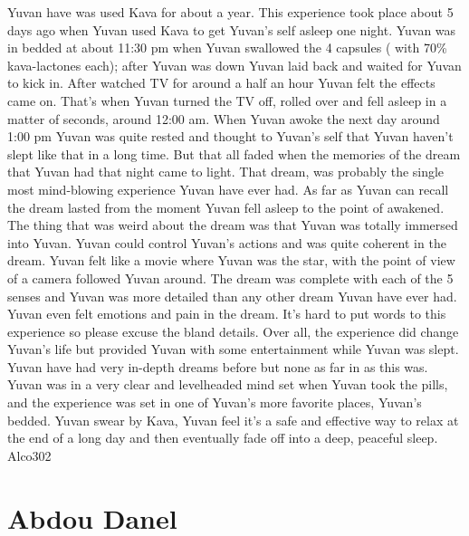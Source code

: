 \documentclass[12pt]{book}
\begin{document}
Yuvan have was used Kava for about a year. This experience took place about 5 days ago when Yuvan used Kava to get Yuvan's self asleep one night. Yuvan was in bedded at about 11:30 pm when Yuvan swallowed the 4 capsules ( with 70\% kava-lactones each); after Yuvan was down Yuvan laid back and waited for Yuvan to kick in. After watched TV for around a half an hour Yuvan felt the effects came on. That's when Yuvan turned the TV off, rolled over and fell asleep in a matter of seconds, around 12:00 am. When Yuvan awoke the next day around 1:00 pm Yuvan was quite rested and thought to Yuvan's self that Yuvan haven't slept like that in a long time. But that all faded when the memories of the dream that Yuvan had that night came to light. That dream, was probably the single most mind-blowing experience Yuvan have ever had. As far as Yuvan can recall the dream lasted from the moment Yuvan fell asleep to the point of awakened. The thing that was weird about the dream was that Yuvan was totally immersed into Yuvan. Yuvan could control Yuvan's actions and was quite coherent in the dream. Yuvan felt like a movie where Yuvan was the star, with the point of view of a camera followed Yuvan around. The dream was complete with each of the 5 senses and Yuvan was more detailed than any other dream Yuvan have ever had. Yuvan even felt emotions and pain in the dream. It's hard to put words to this experience so please excuse the bland details. Over all, the experience did change Yuvan's life but provided Yuvan with some entertainment while Yuvan was slept. Yuvan have had very in-depth dreams before but none as far in as this was. Yuvan was in a very clear and levelheaded mind set when Yuvan took the pills, and the experience was set in one of Yuvan's more favorite places, Yuvan's bedded. Yuvan swear by Kava, Yuvan feel it's a safe and effective way to relax at the end of a long day and then eventually fade off into a deep, peaceful sleep. Alco302



\chapter{Abdou Danel}
\end{document}
